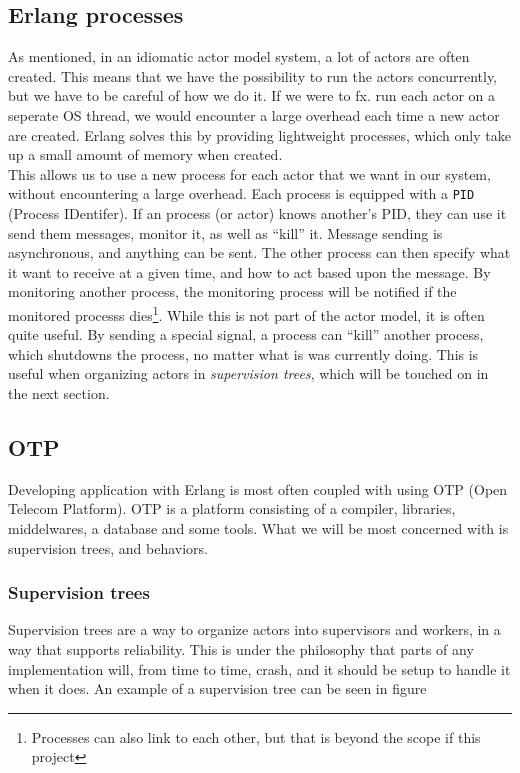 \documentclass[a4paper]{article}
\begin{document}
\subsection{Erlang processes}
As mentioned, in an idiomatic actor model system, a lot of actors are often
created. This means that we have the possibility to run the actors concurrently,
but we have to be careful of how we do it. If we were to fx. run each actor on a
seperate OS thread, we would encounter a large overhead each time a new actor
are created. Erlang solves this by providing lightweight processes, which only
take up a small amount of memory when created.\\

\noindent
This allows us to use a new process for each actor that we want in our system,
without encountering a large overhead. Each process is equipped with a
\texttt{PID} (Process IDentifer). If an process (or actor) knows another's PID,
they can use it send them messages, monitor it, as well as ``kill'' it. Message
sending is asynchronous, and anything can be sent. The other process can then
specify what it want to receive at a given time, and how to act based upon the
message. By monitoring another process, the monitoring process will be notified
if the monitored processs dies\footnote{Processes can also link to each other,
but that is beyond the scope if this project}. While this is not part of the
actor model, it is often quite useful. By sending a special signal, a process
can ``kill'' another process, which shutdowns the process, no matter what is was
currently doing. This is useful when organizing actors in
\textit{supervision trees}, which will be touched on in the next section.

\subsection{OTP}
Developing application with Erlang is most often coupled with using OTP (Open
Telecom Platform). OTP is a platform consisting of a compiler, libraries,
middelwares, a database and some tools. What we will be most concerned with is
supervision trees, and behaviors.

\subsubsection{Supervision trees}
Supervision trees are a way to organize actors into supervisors and workers, in
a way that supports reliability. This is under the philosophy that parts of any
implementation will, from time to time, crash, and it should be setup to handle
it when it does. An example of a supervision tree can be seen in figure %
\end{document}
